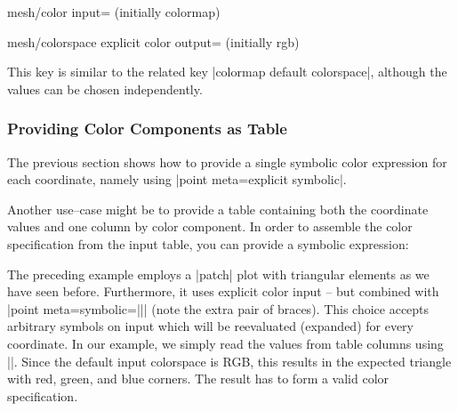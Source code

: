 {{\begin{pgfplotskey}{mesh/color input= (initially colormap)}
\begin{pgfplotskey}{%
	mesh/colorspace explicit color output= (initially rgb)%
}
\begin{codeexample}[]
\end{codeexample}


	This key is similar to the related key |colormap default colorspace|, although the values can be chosen independently.
\end{pgfplotskey}

\subsubsection{Providing Color Components as Table}
The previous section shows how to provide a single symbolic color expression for each coordinate, namely using |point meta=explicit symbolic|.

Another use--case might be to provide a table containing both the coordinate values and one column by color component. In order to assemble the color specification from the input table, you can provide a symbolic expression:
\begin{codeexample}[]
\end{codeexample}
The preceding example employs a |patch| plot with triangular elements as we have seen before. Furthermore, it uses explicit color input -- but combined with |point meta={symbolic=||}| (note the extra pair of braces). This choice accepts arbitrary symbols on input which will be reevaluated (expanded) for every coordinate. In our example, we simply read the values from table columns using |\thisrow|. Since the default input colorspace is RGB, this results in the expected triangle with red, green, and blue corners. The result has to form a valid color specification.


\end{pgfplotskey}}}
